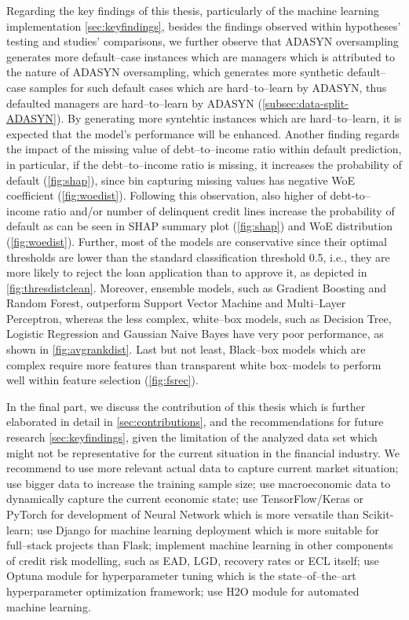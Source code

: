 Regarding the key findings of this thesis, particularly of the machine learning implementation \autoref{sec:keyfindings}, besides the findings observed within hypotheses' testing and studies' comparisons, we further observe that ADASYN oversampling generates more default--case instances which are managers
which is attributed to the nature of ADASYN oversampling,
which generates more synthetic default--case samples for such default cases which are hard--to--learn by ADASYN,
thus defaulted managers are hard--to--learn by ADASYN (\autoref{subsec:data-split-ADASYN}).
By generating more syntehtic instances which are hard--to--learn, it is expected that the model's performance will be enhanced.
Another finding regards the impact of the missing value of debt--to--income ratio within default prediction, in particular, if the debt--to--income ratio is missing, it increases the probability of default (\autoref{fig:shap}), since bin capturing missing values has negative WoE coefficient (\autoref{fig:woedist}).
Following this observation, also higher of debt-to--income ratio and/or number of delinquent credit lines increase the probability of default as can be seen in SHAP summary plot (\autoref{fig:shap}) and WoE distribution (\autoref{fig:woedist}).
Further, most of the models are conservative since their optimal thresholds are lower than the standard classification threshold 0.5, i.e., they are more likely to reject the loan application than to approve it, as depicted in \autoref{fig:thresdistclean}.
Moreover, ensemble models, such as Gradient Boosting and Random Forest, outperform Support Vector Machine and Multi--Layer Perceptron, whereas the less complex, white--box models, such as Decision Tree, Logistic Regression and Gaussian Naive Bayes have very poor performance, as shown in \autoref{fig:avgrankdist}.
Last but not least, Black--box models which are complex require more features than transparent white box--models to perform well within feature selection (\autoref{fig:fsrec}).

In the final part, we discuss the contribution of this thesis which is further elaborated in detail in \autoref{sec:contributions}, and the recommendations for future research \autoref{sec:keyfindings}, given the limitation of the analyzed data set which might not be representative for the current situation in the financial industry.
We recommend to use more relevant actual data to capture current market situation; use bigger data to increase the training sample size; use macroeconomic data to dynamically capture the current economic state;
use TensorFlow/Keras or PyTorch for development of Neural Network which is more versatile than Scikit-learn; use Django for machine learning deployment which is more suitable for full--stack projects than Flask;
implement machine learning in other components of credit risk modelling, such as EAD, LGD, recovery rates or ECL itself; use Optuna module for hyperparameter tuning which is the state--of--the--art hyperparameter optimization framework; use H2O module for automated machine learning.